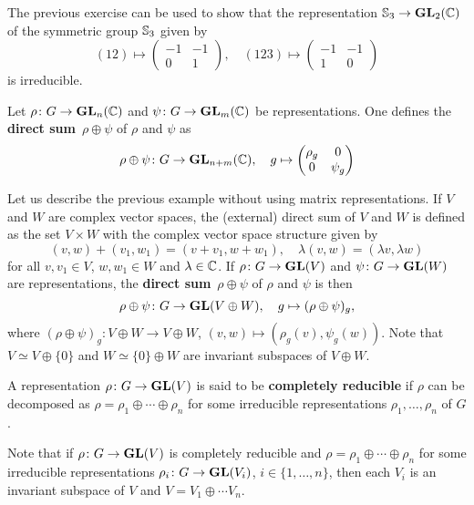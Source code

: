 The previous exercise can be used to show that the representation
$\mathbb{S}_3\to\mathbf{GL}_2(\mathbb{C})$
of the symmetric group $\mathbb{S}_3$
given by
\[
(12)\mapsto\begin{pmatrix}
-1&-1\\0&1
\end{pmatrix},
\quad
(123)\mapsto\begin{pmatrix}
-1&-1\\
1&0
\end{pmatrix}
\]
is irreducible.

\begin{example}
Let $\rho\colon G\to\mathbf{GL}_n(\mathbb{C})$ and $\psi\colon G\to\mathbf{GL}_m(\mathbb{C})$ be representations. One defines
the \textbf{direct sum} $\rho\oplus\psi$ of $\rho$ and $\psi$ as 
\[
\rho\oplus\psi\colon G\to\mathbf{GL}_{n+m}(\mathbb{C}),\quad
g\mapsto 
\begin{pmatrix}
\rho_g & 0\\
0 & \psi_g	
\end{pmatrix}
\]
\end{example}

Let us describe the previous example without using matrix representations. If $V$ and 
$W$ are complex vector spaces, the (external) direct sum of $V$ and $W$ is defined
as the set $V\times W$ with the complex vector space structure given by
\[
(v,w)+(v_1,w_1)=(v+v_1,w+w_1),\quad
\lambda (v,w)=(\lambda v,\lambda w)
\]
for all $v,v_1\in V$, $w,w_1\in W$ and $\lambda\in\mathbb{C}$. 
If $\rho\colon G\to\mathbf{GL}(V)$ and $\psi\colon G\to\mathbf{GL}(W)$ are representations, 
the \textbf{direct sum} $\rho\oplus\psi$ of $\rho$ and $\psi$ is then 
\[
\rho\oplus\psi\colon G\to\mathbf{GL}(V\oplus W),\quad
g\mapsto (\rho\oplus\psi)_g,
\]
where $(\rho\oplus\psi)_g\colon V\oplus W\to V\oplus W$, 
$(v,w)\mapsto (\rho_g(v),\psi_g(w))$. Note that
$V\simeq V\oplus\{0\}$ and $W\simeq \{0\}\oplus W$ are
invariant subspaces of $V\oplus W$. 

\begin{definition}
    A representation $\rho\colon G\to\mathbf{GL}(V)$ is said to be 
    \textbf{completely reducible}
    if $\rho$ can be decomposed as
    $\rho=\rho_1\oplus\cdots\oplus \rho_n$ for some irreducible
    representations $\rho_1,\dots,\rho_n$ of $G$. 
\end{definition}

Note that if $\rho\colon G\to\mathbf{GL}(V)$ is completely reducible and 
$\rho=\rho_1\oplus\cdots\oplus \rho_n$ for some irreducible representations 
$\rho_i\colon G\to\mathbf{GL}(V_i)$, $i\in\{1,\dots,n\}$, then 
each $V_i$ is an invariant subspace of $V$ and $V=V_1\oplus \cdots V_n$. 

